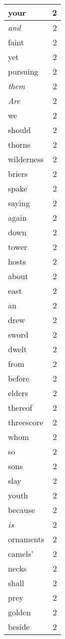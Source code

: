\begin{center}
\begin{longtable}{l|r}
your & 2\\ \hline 
\emph{and} & 2\\ \hline 
faint & 2\\ \hline 
yet & 2\\ \hline 
pursuing & 2\\ \hline 
\emph{them} & 2\\ \hline 
\emph{Are} & 2\\ \hline 
we & 2\\ \hline 
should & 2\\ \hline 
thorns & 2\\ \hline 
wilderness & 2\\ \hline 
briers & 2\\ \hline 
spake & 2\\ \hline 
saying & 2\\ \hline 
again & 2\\ \hline 
down & 2\\ \hline 
tower & 2\\ \hline 
hosts & 2\\ \hline 
about & 2\\ \hline 
east & 2\\ \hline 
an & 2\\ \hline 
drew & 2\\ \hline 
sword & 2\\ \hline 
dwelt & 2\\ \hline 
from & 2\\ \hline 
before & 2\\ \hline 
elders & 2\\ \hline 
thereof & 2\\ \hline 
threescore & 2\\ \hline 
whom & 2\\ \hline 
so & 2\\ \hline 
sons & 2\\ \hline 
slay & 2\\ \hline 
youth & 2\\ \hline 
because & 2\\ \hline 
\emph{is} & 2\\ \hline 
ornaments & 2\\ \hline 
camels' & 2\\ \hline 
necks & 2\\ \hline 
shall & 2\\ \hline 
prey & 2\\ \hline 
golden & 2\\ \hline 
beside & 2\\ \hline 

\end{longtable}
\end{center}

